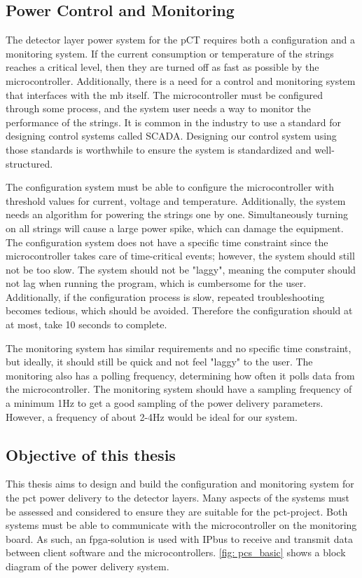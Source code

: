 \documentclass[main.tex]{subfiles}
\begin{document}
\subsection{Power Control and Monitoring}

The detector layer power system for the pCT requires both a configuration and a monitoring system. If the current consumption or temperature of the strings reaches a critical level, then they are turned off as fast as possible by the microcontroller. Additionally, there is a need for a control and monitoring system that interfaces with the \gls{mb} itself. The microcontroller must be configured through some process, and the system user needs a way to monitor the performance of the strings. It is common in the industry to use a standard for designing control systems called SCADA. Designing our control system using those standards is worthwhile to ensure the system is standardized and well-structured.

The configuration system must be able to configure the microcontroller with threshold values for current, voltage and temperature. Additionally, the system needs an algorithm for powering the strings one by one. Simultaneously turning on all strings will cause a large power spike, which can damage the equipment. The configuration system does not have a specific time constraint since the microcontroller takes care of time-critical events; however, the system should still not be too slow. The system should not be "laggy", meaning the computer should not lag when running the program, which is cumbersome for the user. Additionally, if the configuration process is slow, repeated troubleshooting becomes tedious, which should be avoided. Therefore the configuration should at at most, take 10 seconds to complete.

The monitoring system has similar requirements and no specific time constraint, but ideally, it should still be quick and not feel "laggy" to the user. The monitoring also has a polling frequency, determining how often it polls data from the microcontroller. The monitoring system should have a sampling frequency of a minimum 1Hz to get a good sampling of the power delivery parameters. However, a frequency of about 2-4Hz would be ideal for our system.

\subsection{Objective of this thesis}

This thesis aims to design and build the configuration and monitoring system for the \gls{pct} power delivery to the detector layers. Many aspects of the systems must be assessed and considered to ensure they are suitable for the \gls{pct}-project. Both systems must be able to communicate with the microcontroller on the monitoring board. As such, an \acrshort{fpga}-solution is used with IPbus to receive and transmit data between client software and the microcontrollers. \autoref{fig: pcs_basic} shows a block diagram of the power delivery system.
\end{document}
